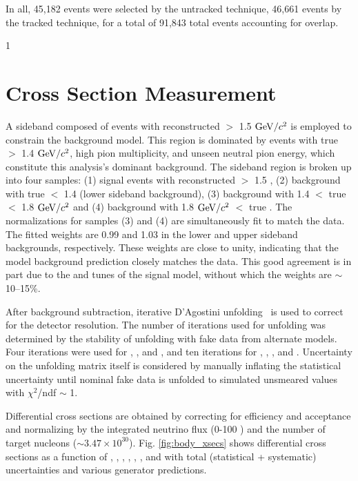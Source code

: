 \documentclass[aps,prl,twocolumn,showpacs,superscriptaddress,letterpaper,showkeys,superscriptaddress,floatfix,nofootinbib]{revtex4-1}
\newcommand{\showSections}[0]{0}
\begin{document}
In all, 45,182 events were selected by the untracked technique, 46,661 events by the tracked technique, for a total of 91,843 total events accounting for overlap.

\if\showSections1 \section{Cross Section Measurement} \fi

A sideband composed of events with reconstructed \Wexp $>$ 1.5 $\mathrm{GeV}/c^2$ is employed to constrain the background model. This region is dominated by events with true \Wexp $>$ 1.4 $\mathrm{GeV}/c^2$,  high pion multiplicity, and unseen neutral pion energy, which constitute this analysis's dominant background. The sideband region is broken up into four samples: (1) signal events with reconstructed \Wexp $>$ 1.5 \GeVcsq, (2) background with true \Wexp $<$ 1.4 \GeVcsq (lower sideband background), (3) background with 1.4 $<$ true \Wexp $<$ 1.8  $\mathrm{GeV}/c^2$ and (4) background with 1.8 $\mathrm{GeV}/c^2$ $<$ true \Wexp. The normalizations for samples (3) and (4) are simultaneously fit to match the data. The fitted weights are 0.99 and 1.03 in the lower and upper sideband backgrounds, respectively. These weights are close to unity, indicating that the model background prediction closely matches the data. This good agreement is in part due to the \Qsq and \Tpi tunes of the signal model, without which the weights are $\sim$10--15\%.

After background subtraction, iterative D'Agostini unfolding~\cite{D'Agostini:1994zf,DAgostini:2010xxxxx,Adye:2011gm} is used to correct for the detector resolution. The number of iterations used for unfolding was determined by the stability of unfolding with fake data from alternate models. Four iterations were used for \pmu, \pzmu, and \thmu, and ten iterations for \Tpi, \thpi, \ptmu, and \Qsq. Uncertainty on the unfolding matrix itself is considered by manually inflating the statistical uncertainty until nominal fake data is unfolded to simulated unsmeared values with $\chi^2$/ndf $\sim$ 1. 

Differential cross sections are obtained by correcting for efficiency and acceptance and normalizing by the integrated neutrino flux (0-100 \GeV) and the number of target nucleons ($\sim 3.47\times10^{30}$). Fig. \ref{fig:body_xsecs} shows differential cross sections as a function of \Tpi, \thpi, \pmu, \pzmu, \ptmu, \thmu, and \Qsq with total (statistical + systematic) uncertainties and various generator predictions.
\end{document}
